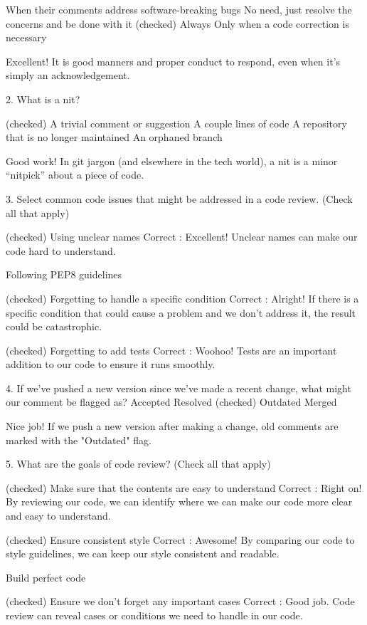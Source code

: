 \documentclass[11pt, onecolumn]{article}
\begin{document}
When their comments address software-breaking bugs
No need, just resolve the concerns and be done with it
(checked) Always
Only when a code correction is necessary

Excellent! It is good manners and proper conduct to respond, even when it's simply an acknowledgement.


2. What is a nit?

(checked) A trivial comment or suggestion
A couple lines of code
A repository that is no longer maintained
An orphaned branch

Good work! In git jargon (and elsewhere in the tech world), a nit is a minor “nitpick” about a piece of code.


3. Select common code issues that might be addressed in a code review. (Check all that apply)

(checked) Using unclear names
Correct : Excellent! Unclear names can make our code hard to understand.

Following PEP8 guidelines

(checked) Forgetting to handle a specific condition
Correct : Alright! If there is a specific condition that could cause a problem and we don't address it, the result could be catastrophic.

(checked) Forgetting to add tests
Correct : Woohoo! Tests are an important addition to our code to ensure it runs smoothly.


4. If we've pushed a new version since we've made a recent change, what might our comment be flagged as?
Accepted
Resolved
(checked) Outdated
Merged

Nice job! If we push a new version after making a change, old comments are marked with the "Outdated" flag.


5. What are the goals of code review? (Check all that apply)

(checked) Make sure that the contents are easy to understand
Correct : Right on! By reviewing our code, we can identify where we can make our code more clear and easy to understand.

(checked) Ensure consistent style
Correct : Awesome! By comparing our code to style guidelines, we can keep our style consistent and readable.

Build perfect code

(checked) Ensure we don't forget any important cases
Correct : Good job. Code review can reveal cases or conditions we need to handle in our code.


\end{document}
